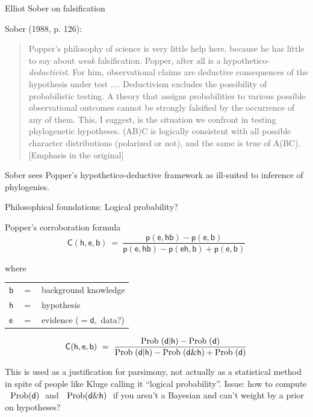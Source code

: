 \documentclass[bluish,slideColor,colorBG,pdf]{prosper}
\def\Prob{{\rm Prob\;}}
\def\PROB{{\rm \;Prob}}
\begin{document}
\begin{slide}[Replace]{Elliot Sober on falsification}

Sober (1988, p. 126):

\begin{quote}
Popper's philosophy of science is very little help here, because he has
little to say about {\it weak} falsification.  Popper, after all is a
hypothetico-{\it deductivist}.  For him, observational claims are deductive
consequences of the hypothesis under test .... Deductivism excludes
the possibility of probabilistic testing.  A theory that assigns probabilities
to various possible observational outcomes cannot be strongly falsified by
the occurrence of any of them.  This, I suggest, is the situation we confront
in testing phylogenetic hypotheses.  (AB)C is logically consistent with
all possible character distributions (polarized or not), and the same is
true of A(BC).  [Emphasis in the original]
\end{quote}

Sober sees Popper's hypothetico-deductive framework as ill-suited to
inference of phylogenies.

\end{slide}

\begin{slide}[Replace]{Philosophical foundations: Logical probability?}

\noindent
Popper's corroboration formula
\[
\mathsf{C(h, e, b) \ = \ \frac{p(e, hb) - p(e, b)}{p(e, hb) - p(eh, b) + p(e, b)}}
\]

\noindent
where\\
\begin{tabular}{l l l}
$\mathsf{b}$ & $\mathsf{=}$ & background knowledge \\
$\mathsf{h}$ & $\mathsf{=}$ & hypothesis \\
$\mathsf{e}$ & $\mathsf{=}$ & evidence  ($\mathsf{ = d},$  data?)
\end{tabular}

\[
\mathsf{C(h, e, b) \ = \ \frac{\Prob(d | h) - \Prob(d)}{\Prob(d | h) - \Prob(d \& h) + \Prob(d)}}
\]

This is used as a justification for parsimony, not actually as a
statistical method in spite of people like Kluge calling it ``logical
probability''.  Issue:  how to compute $\ \mathsf{\PROB(d)}\ $ and $\ \mathsf{\PROB(d \& h)}\ $ if you aren't a
Bayesian and can't weight by a prior on hypotheses?

\end{slide}
\end{document}

